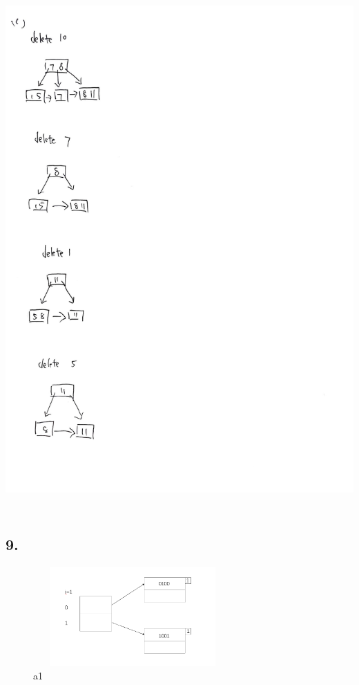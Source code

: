 \documentclass[10pt]{article}
\begin{document}
\includegraphics[width=15cm, height=20cm]{8_c}

\subsection*{9.}
\begin{figure}[h]
        \centering
        \includegraphics[height = 1.5in, width = 3in]{figure/9a1.png}
        \caption{a1}
    \end{figure}
\bigskip
\end{document}
